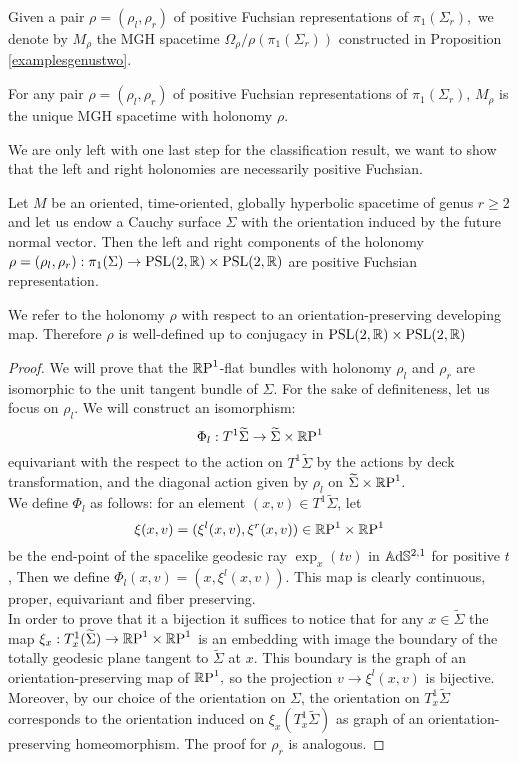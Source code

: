 Given a pair $\rho=(\rho_l,\rho_r)$ of positive Fuchsian representations of $\pi_1(\Sigma_r),$ we denote by $M_\rho$ the MGH spacetime $\Omega_\rho/\rho(\pi_1(\Sigma_r))$ constructed in Proposition \ref{examplesgenustwo}.

\begin{corollary}
    For any pair $\rho=(\rho_l,\rho_r)$ of positive Fuchsian representations of $\pi_1(\Sigma_r)$, $M_\rho$ is the unique MGH spacetime with holonomy $\rho$.
\end{corollary}

We are only left with one last step for the classification result, we want to show that the left and right holonomies are necessarily positive Fuchsian. 

\begin{proposition}\label{553}
    Let $M$ be an oriented, time-oriented, globally hyperbolic spacetime of genus $r\geq 2$ and let us endow a Cauchy surface $\Sigma$ with the orientation induced by the future normal vector. Then the left and right components of the holonomy $\rho=(\rho_l,\rho_r):\pi_1(\Sigma)\to\text{PSL}(2,\R)\times\text{PSL}(2,\R)$ are positive Fuchsian representation. 
\end{proposition}

\begin{observation}
We refer to the holonomy $\rho$ with respect to an orientation-preserving developing map. Therefore $\rho$ is well-defined up to conjugacy in $\text{PSL}(2,\R)\times\text{PSL}(2,\R)$
\end{observation}
\begin{proof}
    We will prove that the $\S$-flat bundles with holonomy $\rho_l$ and $\rho_r$ are isomorphic to the unit tangent bundle of $\Sigma.$ For the sake of definiteness, let us focus on $\rho_l$. We will construct an isomorphism: 
    \[
        \Phi_l:T^1\widetilde{\Sigma}\to \widetilde{\Sigma}\times\S
    \]
    equivariant with the respect to the action on $T^1\widetilde{\Sigma}$ by the actions by deck transformation, and the diagonal action given by $\rho_l$ on $\widetilde{\Sigma}\times\S.$ \\
    We define $\Phi_l$ as follows: for an element $(x,v)\in T^1\widetilde{\Sigma}$, let 
    \[
        \xi(x,v)=(\xi^l(x,v),\xi^r(x,v))\in \T
    \]
    be the end-point of the spacelike geodesic ray $\exp_x(tv)$ in $\A^{2,1}$ for positive $t$, Then we define $\Phi_l(x,v)=(x,\xi^l(x,v)).$ This map is clearly continuous, proper, equivariant and fiber preserving. \\
    In order to prove that it a bijection it suffices to notice that for any $x\in\widetilde{\Sigma}$ the map $\xi_x:T_x^1(\widetilde{\Sigma})\to\T$ is an embedding with image the boundary of the totally geodesic plane tangent to $\widetilde{\Sigma}$ at $x$. This boundary is the graph of an orientation-preserving map of $\S,$ so the projection $v\to\xi^l(x,v)$ is bijective. Moreover, by our choice of the orientation on $\Sigma$, the orientation on $T_x^1\widetilde{\Sigma}$ corresponds to the orientation induced on $\xi_x(T^1_x\widetilde{\Sigma})$ as graph of an orientation-preserving homeomorphism. The proof for $\rho_r$ is analogous.
\end{proof}


